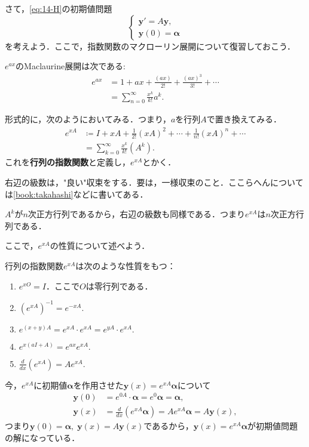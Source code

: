 さて，\eqref{eq:14-H}の初期値問題
\[ \begin{cases}
    \bm{y}' = A\bm{y}, \\
    \bm{y}(0) = \bm{\alpha}
\end{cases}\]
を考えよう．ここで，指数関数のマクローリン展開について復習しておこう．
\begin{remind}[指数関数の]
    $e^{ax}$のMaclaurine展開は次である:
    \begin{align*}
        e^{ax} &= 1 + ax + \frac{(ax)}{2!} + \frac{(ax)^3}{3!} + \cdots \\
        &= \sum_{n=0}^{\infty} \frac{x^k}{k!} a^k.
    \end{align*}
\end{remind}
形式的に，次のようにおいてみる．つまり，$a$を行列$A$で置き換えてみる．
\begin{align*}
    e^{xA} &\coloneqq I + xA + \frac{1}{2!}(xA)^2 + \cdots + \frac{1}{n!}(xA)^n + \cdots \\ 
    &= \sum_{k=0}^{\infty} \frac{x^k}{k!}(A^k).
\end{align*}
これを\textbf{行列の指数関数}と定義し，$e^{xA}$とかく．
\begin{note*}
    右辺の級数は，"良い"収束をする．要は，一様収束のこと．ここらへんについては\ref{book:takahashi}などに書いてある．
\end{note*}
$A^k$が$n$次正方行列であるから，右辺の級数も同様である．つまり$e^{xA}$は$n$次正方行列である．

ここで，$e^{xA}$の性質について述べよう．
\begin{proposition}
    行列の指数関数$e^{xA}$は次のような性質をもつ：
    \begin{enumerate}[label=(\arabic*)]
        \item $e^{x O} = I$．ここで$O$は零行列である．
        \item $(e^{xA})^{-1} = e^{-xA}.$
        \item $e^{(x+y)A} = e^{xA} \cdot e^{xA} = e^{yA} \cdot e^{xA}.$
        \item $e^{x(aI+A)} = e^{ax} e^{xA}.$
        \item $\displaystyle \frac{d}{dx}(e^{xA}) = A e^{xA}.$
    \end{enumerate}
\end{proposition}
今，$e^{xA}$に初期値$\bm{\alpha}$を作用させた$\bm{y}(x)=e^{xA}\bm{\alpha}$について
\begin{align*}
    \bm{y}(0) &= e^{0A} \cdot \bm{\alpha} = e^0 \pmb{\alpha} = \bm{\alpha}, \\
    \bm{y}(x) &= \frac{d}{dx}(e^{xA}\bm{\alpha}) = Ae^{xA}\bm{\alpha} = A\bm{y}(x),
\end{align*}
つまり$\bm{y}(0)=\bm{\alpha}, \; \bm{y}(x)=A\bm{y}(x)$であるから，$\bm{y}(x)=e^{xA}\bm{\alpha}$が初期値問題の解になっている．

